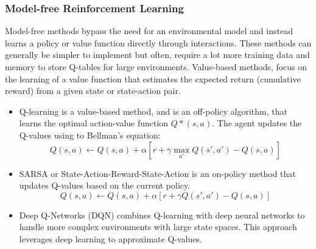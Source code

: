 \subsubsection{Model-free Reinforcement Learning}
Model-free methods bypass the need for an environmental model and instead
learns a policy or value function directly through interactions. These methods
can generally be simpler to implement but often, require a lot more training data 
and memory to store Q-tables for large environments.
Value-based methods, focus on the learning of a value function that estimates 
the expected return (cumulative reward) from a given state or state-action pair.
\begin{itemize}
      \item Q-learning is a value-based method, and is an off-policy algorithm,
      that learns the optimal action-value function \(Q*(s,a) \). The agent updates the 
      Q-values using to Bellman's equation: \cite{Types-of-Reinforcement-Learning}
      \begin{equation}
            Q(s,a) \leftarrow Q(s,a) + \alpha [r + \gamma \max_{a'} Q(s',a') - Q(s,a)]
      \end{equation}
      \item SARSA or State-Action-Reward-State-Action is an on-policy method that 
      updates Q-values based on the current policy. \cite{SARSA}
      \begin{equation}
            Q(s,a) \leftarrow Q(s,a) + \alpha [r + \gamma Q(s',a') - Q(s,a)]
      \end{equation}
      \item Deep Q-Networks (DQN) combines Q-learning with deep neural networks 
      to handle more complex environments with large state spaces. This approach leverages deep learning 
      to approximate Q-values. \cite{Types-of-Reinforcement-Learning}
\end{itemize}


